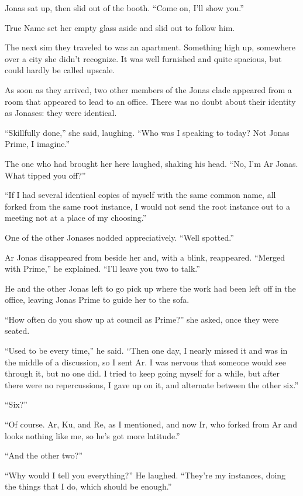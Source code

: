 Jonas sat up, then slid out of the booth. ``Come on, I'll show you.''

True Name set her empty glass aside and slid out to follow him.

The next sim they traveled to was an apartment. Something high up, somewhere over a city she didn't recognize. It was well furnished and quite spacious, but could hardly be called upscale.

As soon as they arrived, two other members of the Jonas clade appeared from a room that appeared to lead to an office. There was no doubt about their identity as Jonases: they were identical.

``Skillfully done,'' she said, laughing. ``Who was I speaking to today? Not Jonas Prime, I imagine.''

The one who had brought her here laughed, shaking his head. ``No, I'm Ar Jonas. What tipped you off?''

``If I had several identical copies of myself with the same common name, all forked from the same root instance, I would not send the root instance out to a meeting not at a place of my choosing.''

One of the other Jonases nodded appreciatively. ``Well spotted.''

Ar Jonas disappeared from beside her and, with a blink, reappeared. ``Merged with Prime,'' he explained. ``I'll leave you two to talk.''

He and the other Jonas left to go pick up where the work had been left off in the office, leaving Jonas Prime to guide her to the sofa.

``How often do you show up at council as Prime?'' she asked, once they were seated.

``Used to be every time,'' he said. ``Then one day, I nearly missed it and was in the middle of a discussion, so I sent Ar. I was nervous that someone would see through it, but no one did. I tried to keep going myself for a while, but after there were no repercussions, I gave up on it, and alternate between the other six.''

``Six?''

``Of course. Ar, Ku, and Re, as I mentioned, and now Ir, who forked from Ar and looks nothing like me, so he's got more latitude.''

``And the other two?''

``Why would I tell you everything?'' He laughed. ``They're my instances, doing the things that I do, which should be enough.''

